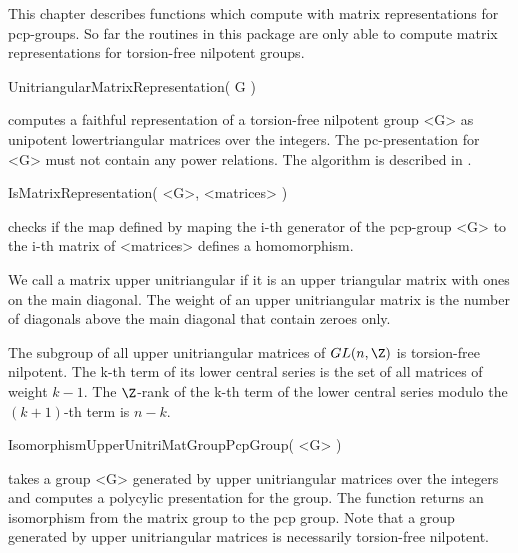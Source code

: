 

This chapter describes functions which compute with matrix
representations for pcp-groups.  So far the routines in this package
are only able to compute matrix representations for torsion-free
nilpotent groups.


\>UnitriangularMatrixRepresentation( G )

computes a faithful representation of a torsion-free nilpotent group
<G> as unipotent lowertriangular matrices over the integers.  The
pc-presentation for <G> must not contain any power relations.  The
algorithm is described in \cite{dGN02}.

\>IsMatrixRepresentation( <G>, <matrices> )

checks if the map defined by maping the i-th generator of the
pcp-group <G> to the i-th matrix of <matrices> defines a homomorphism.


We call a matrix upper unitriangular if it is an upper triangular
matrix with ones on the main diagonal.  The weight of an upper
unitriangular matrix is the number of diagonals above the main
diagonal that contain zeroes only.  

The subgroup of all upper unitriangular matrices of $GL(n,\Z)$ is
torsion-free nilpotent.  The k-th term of its lower central series is
the set of all matrices of weight $k-1$.  The $\Z$-rank of the k-th
term of the lower central series modulo the $(k+1)$-th term is $n-k$.

\>IsomorphismUpperUnitriMatGroupPcpGroup( <G> )

takes a group <G> generated by upper unitriangular matrices over the
integers and computes a polycylic presentation for the group.  The
function returns an isomorphism from the matrix group to the pcp
group.  Note that a group generated by upper unitriangular matrices is
necessarily torsion-free nilpotent.

